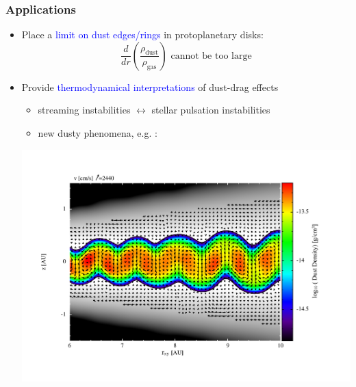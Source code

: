 \documentclass[10pt]{beamer}
\begin{document}
\begin{frame}[t]
  \frametitle{Applications}
  \begin{itemize}
  \item Place a \textcolor{blue}{limit on dust edges/rings} in
    protoplanetary disks: 
    \[
    \frac{d}{dr}\left(\frac{\rho_\text{dust}}{\rho_\text{gas}}\right) 
    \text{ cannot be too large}
    \]
   \pause
  \item Provide \textcolor{blue}{thermodynamical interpretations} of dust-drag
    effects 
    \begin{itemize}
    \item streaming instabilities $\longleftrightarrow$ stellar
      pulsation instabilities \citep{cox67} 
    \item new dusty phenomena, e.g. \citet{loren15}: 
    \end{itemize}
      \begin{center}
        \includegraphics[scale=0.27]{figures/loren1}
      \end{center}
 \end{itemize}

\end{frame}
\end{document}
